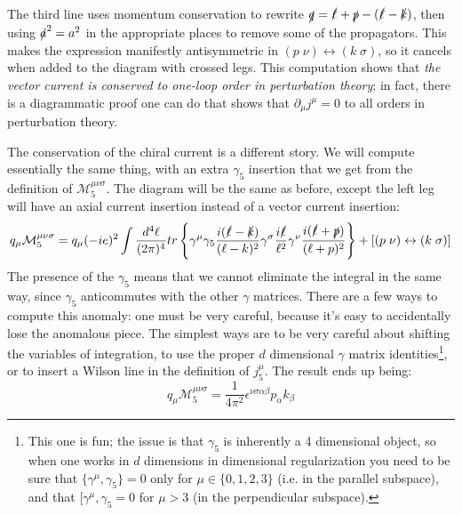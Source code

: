 \documentclass[11pt, oneside]{article}   	%
\theoremstyle{definition}
\numberwithin{equation}{subsection}		%
\begin{document}
The third line uses momentum conservation to rewrite $\slashed q = \slashed \ell + \slashed p - (\slashed\ell - \slashed k)$, then using $\slashed a^2 = a^2$ in the 
appropriate places to remove some of the propagators. This makes the expression manifestly antisymmetric in $(p\;\nu)\leftrightarrow (k\;\sigma)$, so it cancels when added to the 
diagram with crossed legs. This computation shows that \textit{the vector current is conserved to one-loop order in perturbation theory}; in fact, there is a diagrammatic proof 
one can do that shows that $\partial_\mu j^\mu = 0$ to all orders in perturbation theory. 

The conservation of the chiral current is a different story. We will compute essentially the same thing, with an extra $\gamma_5$ insertion that we get from the definition 
of $\mathcal M_5^{\mu\nu\sigma}$. The diagram will be the same as before, except the left leg will have an axial current insertion instead of a vector current insertion:
\begin{equation}
	q_\mu \mathcal M^{\mu\nu\sigma}_5 = q_\mu (-ie)^2 \int \frac{d^4 \ell}{(2\pi)^4} tr\left\{\gamma^\mu\gamma_5 \frac{i(\slashed\ell - \slashed k)}{(\ell - k)^2} \gamma^\sigma \frac{i\slashed\ell}
	{\ell^2}\gamma^\nu\frac{i(\slashed \ell + \slashed p)}{(\ell + p)^2}\right\} + \left[(p\;\nu) \leftrightarrow (k\;\sigma)\right]
\end{equation}
The presence of the $\gamma_5$ means that we cannot eliminate the integral in the same way, since $\gamma_5$ anticommutes with the other $\gamma$ 
matrices. There are a few ways to compute this anomaly: one must be very careful, because it's easy to accidentally lose the anomalous piece. The simplest ways 
are to be very careful about shifting the variables of integration, to use the proper $d$ dimensional $\gamma$ matrix identities\footnote{This one is fun; the issue 
is that $\gamma_5$ is inherently a 4 dimensional object, so when one works in $d$ dimensions in dimensional regularization you need to be sure that 
$\{\gamma^\mu, \gamma_5\} = 0$ only for $\mu\in\{0, 1, 2, 3\}$ (i.e. in the parallel subspace), and that $[\gamma^\mu, \gamma_5 = 0$ for $\mu > 3$ (in the 
perpendicular subspace).}, or to insert a Wilson line in the definition of $j_5^\mu$. The result ends up being:
\begin{equation}
	q_\mu \mathcal M_5^{\mu\nu\sigma} = \frac{1}{4\pi^2} \epsilon^{\nu\sigma\alpha\beta} p_\alpha k_\beta
\end{equation}
\end{document}
